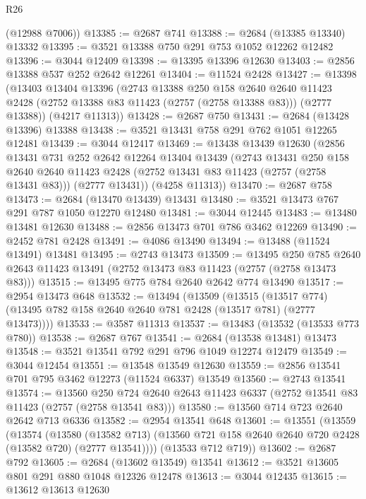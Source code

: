 \begin{lexlean}{R26}
\begin{coremodule}
      (@12988 @7006))
@13385 := @2687 @741
@13388 := @2684 (@13385 @13340) @13332
@13395 := @3521 @13388 @750 @291 @753 @1052 @12262 @12482
@13396 := @3044 @12409
@13398 := @13395 @13396 @12630
@13403 := @2856 @13388 @537 @252 @2642 @12261
@13404 := @11524 @2428
@13427 := @13398
    (@13403
      @13404
      @13396
      (@2743
        @13388
        @250
        @158
        @2640
        @2640
        @11423
        @2428
        (@2752 @13388 @83 @11423 (@2757 (@2758 @13388 @83)))
        (@2777 @13388))
      (@4217 @11313))
@13428 := @2687 @750
@13431 := @2684 (@13428 @13396) @13388
@13438 := @3521 @13431 @758 @291 @762 @1051 @12265 @12481
@13439 := @3044 @12417
@13469 := @13438
    @13439
    @12630
    (@2856
      @13431
      @731
      @252
      @2642
      @12264
      @13404
      @13439
      (@2743
        @13431
        @250
        @158
        @2640
        @2640
        @11423
        @2428
        (@2752 @13431 @83 @11423 (@2757 (@2758 @13431 @83)))
        (@2777 @13431))
      (@4258 @11313))
@13470 := @2687 @758
@13473 := @2684 (@13470 @13439) @13431
@13480 := @3521 @13473 @767 @291 @787 @1050 @12270 @12480
@13481 := @3044 @12445
@13483 := @13480 @13481 @12630
@13488 := @2856 @13473 @701 @786 @3462 @12269
@13490 := @2452 @781 @2428
@13491 := @4086 @13490
@13494 := @13488 (@11524 @13491) @13481
@13495 := @2743 @13473
@13509 := @13495
    @250
    @785
    @2640
    @2643
    @11423
    @13491
    (@2752 @13473 @83 @11423 (@2757 (@2758 @13473 @83)))
@13515 := @13495 @775 @784 @2640 @2642 @774 @13490
@13517 := @2954 @13473 @648
@13532 := @13494
    (@13509
      (@13515 (@13517 @774) (@13495 @782 @158 @2640 @2640 @781 @2428 (@13517 @781) (@2777 @13473))))
@13533 := @3587 @11313
@13537 := @13483 (@13532 (@13533 @773 @780))
@13538 := @2687 @767
@13541 := @2684 (@13538 @13481) @13473
@13548 := @3521 @13541 @792 @291 @796 @1049 @12274 @12479
@13549 := @3044 @12454
@13551 := @13548 @13549 @12630
@13559 := @2856 @13541 @701 @795 @3462 @12273 (@11524 @6337) @13549
@13560 := @2743 @13541
@13574 := @13560
    @250
    @724
    @2640
    @2643
    @11423
    @6337
    (@2752 @13541 @83 @11423 (@2757 (@2758 @13541 @83)))
@13580 := @13560 @714 @723 @2640 @2642 @713 @6336
@13582 := @2954 @13541 @648
@13601 := @13551
    (@13559
      (@13574
        (@13580
          (@13582 @713)
          (@13560 @721 @158 @2640 @2640 @720 @2428 (@13582 @720) (@2777 @13541))))
      (@13533 @712 @719))
@13602 := @2687 @792
@13605 := @2684 (@13602 @13549) @13541
@13612 := @3521 @13605 @801 @291 @880 @1048 @12326 @12478
@13613 := @3044 @12435
@13615 := @13612 @13613 @12630

\end{coremodule}
\end{lexlean}
